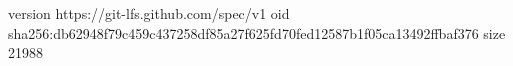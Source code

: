 version https://git-lfs.github.com/spec/v1
oid sha256:db62948f79c459c437258df85a27f625fd70fed12587b1f05ca13492ffbaf376
size 21988
